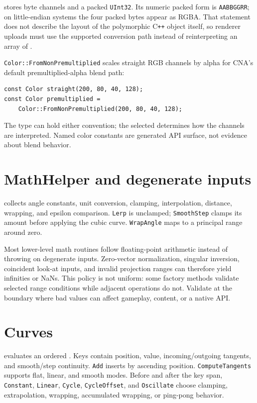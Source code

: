  stores byte channels and a packed \texttt{UInt32}. Its numeric packed form is
\texttt{AABBGGRR}; on little-endian systems the four packed bytes appear as RGBA. That statement
does not describe the layout of the polymorphic C\texttt{++} object itself, so renderer uploads
must use the supported conversion path instead of reinterpreting an array of .

\texttt{Color::FromNonPremultiplied} scales straight RGB channels by alpha for CNA's default
premultiplied-alpha blend path:

\begin{lstlisting}
const Color straight(200, 80, 40, 128);
const Color premultiplied =
    Color::FromNonPremultiplied(200, 80, 40, 128);
\end{lstlisting}

The type can hold either convention; the selected  determines how the
channels are interpreted. Named color constants are generated API surface, not evidence about
blend behavior.

\section{MathHelper and degenerate inputs}

 collects angle constants, unit conversion, clamping, interpolation,
distance, wrapping, and epsilon comparison. \texttt{Lerp} is unclamped; \texttt{SmoothStep}
clamps its amount before applying the cubic curve. \texttt{WrapAngle} maps to a principal range
around zero.

Most lower-level math routines follow floating-point arithmetic instead of throwing on
degenerate inputs. Zero-vector normalization, singular inversion, coincident look-at inputs, and
invalid projection ranges can therefore yield infinities or NaNs. This policy is not uniform:
some factory methods validate selected range conditions while adjacent operations do not.
Validate at the boundary where bad values can affect gameplay, content, or a native API.

\section{Curves}

 evaluates an ordered . Keys contain position,
value, incoming/outgoing tangents, and smooth/step continuity. \texttt{Add} inserts by ascending
position. \texttt{ComputeTangents} supports flat, linear, and smooth modes. Before and after the
key span, \texttt{Constant}, \texttt{Linear}, \texttt{Cycle}, \texttt{CycleOffset}, and
\texttt{Oscillate} choose clamping, extrapolation, wrapping, accumulated wrapping, or ping-pong
behavior.


